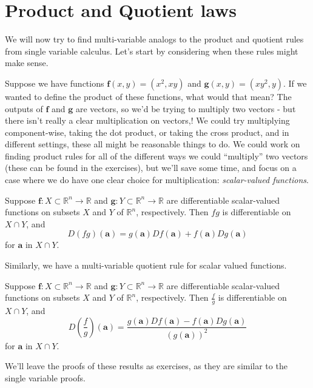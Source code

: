 \documentclass{ximera}
\begin{document}
\section*{Product and Quotient laws}

We will now try to find multi-variable analogs to the product and quotient rules from single variable calculus. Let's start by considering when these rules might make sense.

Suppose we have functions $\mathbf{f}(x,y) = (x^2,xy)$ and $\mathbf{g}(x,y) = (xy^2, y)$. If we wanted to define the product of these functions, what would that mean? The outputs of $\mathbf{f}$ and $\mathbf{g}$ are vectors, so we'd be trying to multiply two vectors - but there isn't really a clear multiplication on vectors,! We could try multiplying component-wise, taking the dot product, or taking the cross product, and in different settings, these all might be reasonable things to do. We could work on finding product rules for all of the different ways we could ``multiply'' two vectors (these can be found in the exercises), but we'll save some time, and focus on a case where we do have one clear choice for multiplication: \emph{scalar-valued functions}.

\begin{proposition}
Suppose $\mathbf{f}:X\subset \mathbb{R}^n\rightarrow \mathbb{R}$ and $\mathbf{g}:Y\subset\mathbb{R}^n\rightarrow\mathbb{R}$ are differentiable scalar-valued functions on subsets $X$ and $Y$ of $\mathbb{R}^n$, respectively. Then $fg$ is differentiable on $X\cap Y$, and \[D(fg)(\mathbf{a})=g(\mathbf{a})Df(\mathbf{a})+f(\mathbf{a})Dg(\mathbf{a})\] for $\mathbf{a}$ in $X\cap Y$.
\end{proposition}

Similarly, we have a multi-variable quotient rule for scalar valued functions.

\begin{proposition}
Suppose $\mathbf{f}:X\subset \mathbb{R}^n\rightarrow \mathbb{R}$ and $\mathbf{g}:Y\subset\mathbb{R}^n\rightarrow\mathbb{R}$ are differentiable scalar-valued functions on subsets $X$ and $Y$ of $\mathbb{R}^n$, respectively. Then $\frac{f}{g}$ is differentiable on $X\cap Y$, and \[D\left(\frac{f}{g}\right)(\mathbf{a})=\frac{g(\mathbf{a})Df(\mathbf{a})-f(\mathbf{a})Dg(\mathbf{a})}{(g(\mathbf{a}))^2}\] for $\mathbf{a}$ in $X\cap Y$.
\end{proposition}

We'll leave the proofs of these results as exercises, as they are similar to the single variable proofs.
\end{document}
